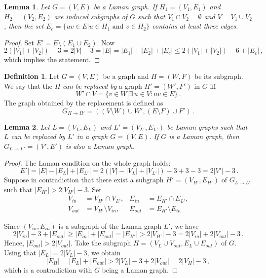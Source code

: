 \documentclass[a4paper, 11pt]{article}
\newtheorem{lem}{Lemma}[section]
\theoremstyle{definition}
\newtheorem{defn}{Definition}[section]
\begin{document}
\begin{lem}
\label{lem:numEdgesBetweenTwoParts}
Let $G=(V,E)$ be a Laman graph. If $H_1=(V_1,E_1)$ and $H_2=(V_2,E_2)$ are induced subgraphs of $G$ such that $V_1 \cap V_2=\emptyset$ and $V=V_1\cup V_2$, then the set $E_c=\{uv\in E | u\in H_1 \text{ and } v\in H_2\}$ contains at least three edges.
\end{lem}
\begin{proof}
Set $E'=E\setminus(E_1 \cup E_2)$. Now
$$
2(|V_1|+|V_2|)-3=2|V|-3=|E|=|E_1|+|E_2|+|E_c| \leq 2(|V_1|+|V_2|)-6 +|E_c|\,,
$$
which implies the statement.
\end{proof}

\begin{defn}
Let $G=(V,E)$ be a graph and $H=(W,F)$ be its subgraph. We say that the $H$ \emph{can be replaced by} a graph $H'=(W',F')$ in $G$ iff
$$
W'\cap V=\{v\in W | \exists\, u\in V \colon uv\in E\}\,.
$$
The graph obtained by the replacement is defined as
$$
G_{H\rightarrow H'}=\left((V\setminus W)\cup W', (E\setminus F)\cup F'\right)\,.
$$
\end{defn}

\begin{lem}
Let $L=(V_L, E_L)$ and $L'=(V_{L'}, E_{L'})$ be Laman graphs such that $L$ can be replaced by $L'$ in a graph $G=(V,E)$. If $G$ is a Laman graph, then $G_{L\rightarrow L'}=(V',E')$ is also a Laman graph. 
\end{lem}
\begin{proof}
The Laman condition on the whole graph holds:
$$
|E'|=|E|- |E_{L}|+ |E_{L'}|=2(|V|- |V_{L}|+ |V_{L'}|)-3+3-3=2|V'|-3\,.
$$
Suppose in contradiction that there exist a subgraph ${H'}=(V_{H'},E_{H'})$ of $G_{L\rightarrow L'}$ such that $|E_{H'}|> 2|V_{H'}|-3$. Set 
\begin{align*}
 V_{in}&=V_{H'}\cap V_{L'}, &E_{in}&=E_{H'}\cap E_{L'}, \\
 V_{out}&=V_{H'} \setminus V_{in}, & E_{out}&=E_{H'} \setminus E_{in}
\end{align*}

Since $(V_{in}, E_{in})$ is a subgraph of the Laman graph $L'$, we have
$$
2|V_{in}|-3 +|E_{out}|\geq  |E_{in}|+|E_{out}|=|E_{H'}|> 2|V_{{H'}}|-3=2|V_{in}|+2|V_{out}|-3\,.
$$
Hence, $|E_{out}|>2|V_{out}|$. Take the subgraph $H=(V_L \cup V_{out}, E_L \cup E_{out})$ of $G$. Using that $|E_L|=2|V_L|-3$, we obtain
$$|E_H|=|E_L|+|E_{out}|>2|V_L|-3+2|V_{out}|=2|V_H|-3\,,$$
which is  a contradiction with $G$ being a  Laman graph.
\end{proof}
\end{document}
